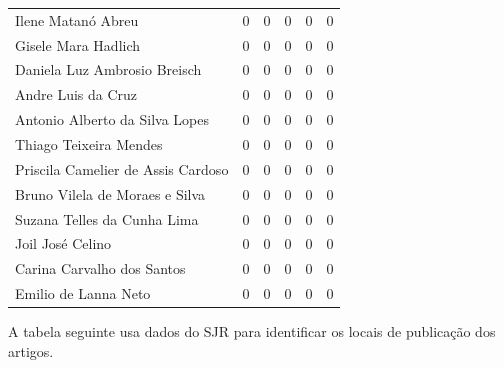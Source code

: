\documentclass[12pt,brazil]{article}\usepackage[]{graphicx}\usepackage[]{xcolor}
\newcounter{tabela}
\begin{document}
\begin{longtable}{lrrrrr}
Ilene Matanó Abreu & 0 & 0 & 0 & 0 & 0 \\
Gisele Mara Hadlich & 0 & 0 & 0 & 0 & 0 \\
Daniela Luz Ambrosio Breisch & 0 & 0 & 0 & 0 & 0 \\
Andre Luis da Cruz & 0 & 0 & 0 & 0 & 0 \\
Antonio Alberto da Silva Lopes & 0 & 0 & 0 & 0 & 0 \\
Thiago Teixeira Mendes & 0 & 0 & 0 & 0 & 0 \\
Priscila Camelier de Assis Cardoso & 0 & 0 & 0 & 0 & 0 \\
Bruno Vilela de Moraes e Silva & 0 & 0 & 0 & 0 & 0 \\
Suzana Telles da Cunha Lima & 0 & 0 & 0 & 0 & 0 \\
\hline Joil José Celino & 0 & 0 & 0 & 0 & 0 \\
Carina Carvalho dos Santos & 0 & 0 & 0 & 0 & 0 \\
Emilio de Lanna Neto & 0 & 0 & 0 & 0 & 0 \\
\end{longtable}


\clearpage

A tabela seguinte usa dados do SJR para identificar os locais de
publicação dos artigos.
\end{document}
